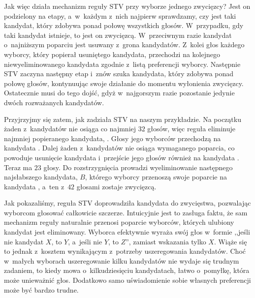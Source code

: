 Jak więc działa mechanizm reguły STV przy wyborze jednego zwycięzcy?
%
%
%
%
%
%
Jest on podzielony na etapy,  a~w~każdym z~nich najpierw sprawdzamy, czy
jest taki kandydat, który zdobywa ponad połowę wszystkich głosów.
%
W~przypadku, gdy taki kandydat istnieje, to jest on zwycięzcą.
W~przeciwnym razie kandydat o~najniższym poparciu jest usuwany
z~grona kandydatów. Z~kolei głos każdego wyborcy, który popierał
usuniętego kandydata, przechodzi na kolejnego niewyeliminowanego
kandydata zgodnie z~listą preferencji wyborcy.
Następnie STV zaczyna następny etap i~znów szuka kandydata,
który zdobywa ponad połowę głosów,
%
kontynuując swoje działanie do momentu wyłonienia zwycięzcy.
Ostatecznie musi do tego dojść, gdyż w~najgorszym razie pozostanie
jedynie dwóch rozważanych kandydatów.

Przyjrzyjmy się zatem, jak zadziała STV na naszym przykładzie.
%
%
Na początku żaden z~kandydatów nie osiąga co najmniej $32$ głosów, więc reguła eliminuje najmniej popieranego
kandydata, . Głosy jego wyborców przechodzą na kandydata .
Dalej żaden z~kandydatów nie osiąga wymaganego poparcia, co powoduje usunięcie kandydata  i~przejście jego głosów
również na kandydata . Teraz  ma $23$ głosy. Do rozstrzygnięcia prowadzi wyeliminowanie następnego
najsłabszego kandydata, $B$, którego wyborcy przenoszą swoje poparcie na kandydata , a~ten z~$42$ głosami  zostaje zwycięzcą.

Jak pokazaliśmy, reguła STV doprowadziła kandydata  do zwycięstwa, pozwalając wyborcom
głosować całkowicie szczerze. Intuicyjnie jest to zasługa faktu, że sam mechanizm reguły naturalnie przenosi poparcie wyborców,
których ulubiony kandydat jest eliminowany.
%
Wyborca efektywnie wyraża
swój głos w~formie ,,jeśli nie kandydat $X$, to $Y$, a~jeśli nie $Y$, to $Z$'', zamiast wskazania tylko $X$.
Wiąże się to jednak z~kosztem wynikającym z~potrzeby uszeregowania kandydatów.
Choć w~małych wyborach uszeregowanie kilku kandydatów nie wydaje się trudnym zadaniem, to kiedy mowa
o~kilkudziesięciu kandydatach, łatwo o~pomyłkę, która może unieważnić głos.
Dodatkowo samo uświadomienie sobie własnych preferencji może być bardzo trudne.

